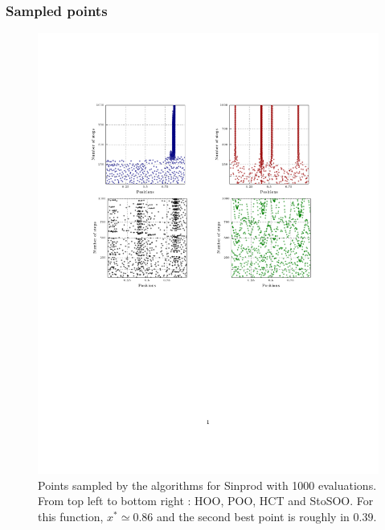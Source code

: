 \documentclass[xcolor={usenames,dvipsnames}]{beamer}
\begin{document}
\begin{frame}
\frametitle{Sampled points}
\begin{figure}
\vspace{-0.5cm}
\includegraphics[trim = {0 6cm 0 4cm},clip,scale = 0.5]{marginal1000.pdf}
\vspace{-2.75cm}
  \caption{\label{fig:position1000}Points sampled by the algorithms for Sinprod with 1000 evaluations. From top left to bottom right : HOO, POO, HCT and StoSOO. For this function, $x^*\simeq 0.86$ and the second best point is roughly in $0.39$.}
\end{figure}
\end{frame}
\end{document}
